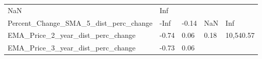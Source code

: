 \documentclass[]{article}
\begin{document}
\begin{longtable}[]{@{}lllll@{}}
\begin{minipage}[t]{0.09\columnwidth}
NaN\strut
\end{minipage} & \begin{minipage}[t]{0.11\columnwidth}\raggedright\strut
Inf\strut
\end{minipage}\tabularnewline
\begin{minipage}[t]{0.49\columnwidth}\raggedright\strut
Percent\_Change\_SMA\_5\_dist\_perc\_change\strut
\end{minipage} & \begin{minipage}[t]{0.08\columnwidth}\raggedright\strut
-Inf\strut
\end{minipage} & \begin{minipage}[t]{0.09\columnwidth}\raggedright\strut
-0.14\strut
\end{minipage} & \begin{minipage}[t]{0.09\columnwidth}\raggedright\strut
NaN\strut
\end{minipage} & \begin{minipage}[t]{0.11\columnwidth}\raggedright\strut
Inf\strut
\end{minipage}\tabularnewline
\begin{minipage}[t]{0.49\columnwidth}\raggedright\strut
EMA\_Price\_2\_year\_dist\_perc\_change\strut
\end{minipage} & \begin{minipage}[t]{0.08\columnwidth}\raggedright\strut
-0.74\strut
\end{minipage} & \begin{minipage}[t]{0.09\columnwidth}\raggedright\strut
0.06\strut
\end{minipage} & \begin{minipage}[t]{0.09\columnwidth}\raggedright\strut
0.18\strut
\end{minipage} & \begin{minipage}[t]{0.11\columnwidth}\raggedright\strut
10,540.57\strut
\end{minipage}\tabularnewline
\begin{minipage}[t]{0.49\columnwidth}\raggedright\strut
EMA\_Price\_3\_year\_dist\_perc\_change\strut
\end{minipage} & \begin{minipage}[t]{0.08\columnwidth}\raggedright\strut
-0.73\strut
\end{minipage} & \begin{minipage}[t]{0.09\columnwidth}\raggedright\strut
0.06\strut
\end{minipage} & \begin{minipage}[t]{0.09\columnwidth}\raggedright\strut

\end{minipage}
\end{longtable}
\end{document}
